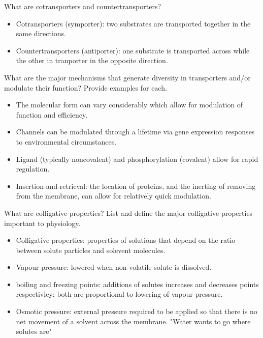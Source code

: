 \documentclass[12pt,a4paper]{article}
\begin{document}
\begin{itemize}
\begin{itemize}
        \end{itemize}
    {\color{G-Moon}\item What are cotransporters and countertransporters?}
        \begin{itemize}
            \item Cotransporters (symporter): two substrates are transported together in the same directions.
            \item Countertransporters (antiporter): one substrate is transported across while the other in tranporter in the opposite direction.
        \end{itemize}
    {\color{G-Moon}\item What are the major mechanisms that generate diversity in transporters and/or modulate their function? Provide examples for each.}
        \begin{itemize}
            \item The molecular form can vary considerably which allow for modulation of function and efficiency.
            \item Channels can be modulated through a lifetime via gene expression responses to environmental circumstances.
            \item Ligand (typically noncovalent) and phosphorylation (covalent) allow for rapid regulation.
            \item Insertion-and-retrieval: the location of proteins, and the inerting of removing from the membrane, can allow for relatively quick modulation.
        \end{itemize}
    {\color{G-Moon}\item What are colligative properties? List and define the major colligative properties important to physiology.}
        \begin{itemize}
            \item Colligative properties: properties of solutions that depend on the ratio between solute particles and solevent molecules.
            \item Vapour pressure: lowered when non-volatile solute is dissolved.
            \item boiling and freezing points: additions of solutes increases and decreases points respectivley; both are proportional to lowering of vapour pressure.
            \item Osmotic pressure: external pressure required to be applied so that there is no net movement of a solvent across the membrane. "Water wants to go where solutes are"
        \end{itemize}

\end{itemize}
\end{document}
